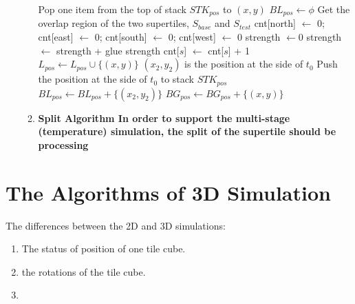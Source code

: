 \documentclass[preprint,natbib,10pt]{article}
\begin{document}
\begin{enumerate}
\begin{enumerate}
\begin{algorithm}
     {
        Pop one item from the top of stack $STK_{pos}$ to $(x,y)$ \;
         {
            $BL_{pos} \gets \phi $ 
            Get the overlap region of the two supertiles, $S_{base}$ and $S_{test}$ \;
            cnt[north] $\gets$ 0; cnt[east] $\gets$ 0; cnt[south] $\gets$ 0; cnt[west] $\gets$ 0 \;
             {
                strength $\gets 0$ \;
                 {
                     {
                         {
                            strength $\gets$ strength + glue strength \;
                            cnt[$s$] $\gets$ cnt[$s$] + 1 \;
                        }
                    }
                }
            }
             {
                $L_{pos} \gets L_{pos} \cup \{(x,y)\}$ \;
            }
             {
                $(x_2,y_2)$ is the position at the side of $t_0$ \;
                 {
                    Push the position at the side of $t_0$ to stack $STK_{pos}$ \;
                    $BL_{pos} \gets BL_{pos} + \{(x_2,y_2)\}$ \;
                }
            }
            $BG_{pos} \gets BG_{pos} + \{(x,y)\}$ \;
        }
    }
    \;
\end{algorithm}

 \item \bf{Split Algorithm}
In order to support the multi-stage (temperature) simulation, the split of the supertile should be processing

\end{enumerate}

\end{enumerate}

\section{The Algorithms of 3D Simulation}
The differences between the 2D and 3D simulations:
\begin{enumerate}
  \item The status of position of one tile cube.
  \item the rotations of the tile cube.
  \item 
\end{enumerate}
\end{document}
